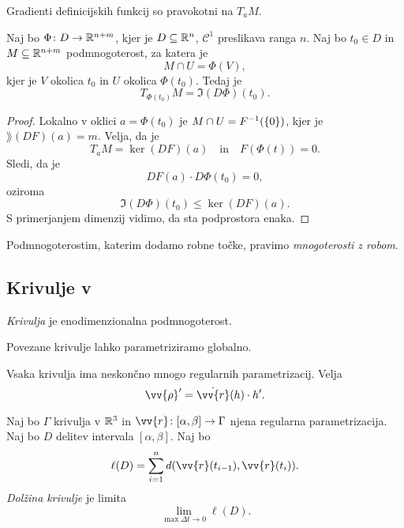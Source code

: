 \begin{opomba}
Gradienti definicijskih funkcij so pravokotni na $T_aM$.
\end{opomba}

\begin{posledica}
Naj bo $\Phi \colon D \to \mathbb{R}^{n+m}$, kjer je $D \subseteq \mathbb{R}^n$,
$\mathcal{C}^1$ preslikava ranga $n$. Naj bo $t_0 \in D$ in
$M \subseteq \mathbb{R}^{n+m}$ podmnogoterost, za katera je
\[
M \cap U = \Phi(V),
\]
kjer je $V$ okolica $t_0$ in $U$ okolica $\Phi(t_0)$. Tedaj je
\[
T_{\Phi(t_0)}M = \Im(D\Phi)(t_0).
\]
\end{posledica}

\begin{proof}
Lokalno v oklici $a = \Phi(t_0)$ je $M \cap U = F^{-1}(\left\{0\right\})$,
kjer je $\rang(DF)(a) = m$. Velja, da je
\[
T_aM = \ker(DF)(a)
\quad \text{in} \quad
F(\Phi(t)) = 0.
\]
Sledi, da je
\[
DF(a) \cdot D\Phi(t_0) = 0,
\]
oziroma
\[
\Im(D\Phi)(t_0) \leq \ker(DF)(a).
\]
S primerjanjem dimenzij vidimo, da sta podprostora enaka.
\end{proof}


\begin{opomba}
Podmnogoterostim, katerim dodamo robne točke, pravimo
\emph{mnogoterosti z robom}.
\end{opomba}

\newpage

\subsection{Krivulje v }

\begin{definicija}
\emph{Krivulja} je enodimenzionalna podmnogoterost.
\end{definicija}

\begin{trditev}
Povezane krivulje lahko parametriziramo globalno.
\end{trditev}

\begin{opomba}
Vsaka krivulja ima neskončno mnogo regularnih parametrizacij. Velja
\[
\vv{\rho}' = \dot{\vv{r}}(h) \cdot h'.
\]
\end{opomba}

\begin{definicija}
Naj bo $\Gamma$ krivulja v $\mathbb{R}^3$ in
$\vv{r} \colon [\alpha, \beta] \to \Gamma$ njena regularna
parametrizacija. Naj bo $D$ delitev intervala $[\alpha, \beta]$.
Naj bo
\[
\ell(D) =
\sum_{i=1}^n d(\vv{r}(t_{i-1}),\vv{r}(t_i)).
\]
\emph{Dolžina krivulje} je limita
\[
\lim_{\max \Delta t \to 0} \ell(D).
\]
\end{definicija}

